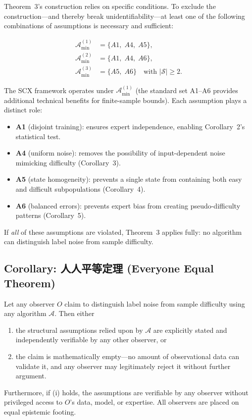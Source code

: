 Theorem~3's construction relies on specific conditions.  To exclude the
construction---and thereby break unidentifiability---at least one of the
following combinations of assumptions is necessary and sufficient:

\[
\begin{aligned}
\mathcal{A}_{\min}^{(1)} &= \{A1,\;A4,\;A5\},\\
\mathcal{A}_{\min}^{(2)} &= \{A1,\;A4,\;A6\},\\
\mathcal{A}_{\min}^{(3)} &= \{A5,\;A6\}\quad\text{with }|\mathcal{S}|\ge2.
\end{aligned}
\]

The SCX framework operates under $\mathcal{A}_{\min}^{(1)}$ (the standard
set A1--A6 provides additional technical benefits for finite-sample bounds).
Each assumption plays a distinct role:
\begin{itemize}
  \item \textbf{A1} (disjoint training): ensures expert independence, enabling
    Corollary~2's statistical test.
  \item \textbf{A4} (uniform noise): removes the possibility of
    input-dependent noise mimicking difficulty (Corollary~3).
  \item \textbf{A5} (state homogeneity): prevents a single state from
    containing both easy and difficult subpopulations (Corollary~4).
  \item \textbf{A6} (balanced errors): prevents expert bias from creating
    pseudo-difficulty patterns (Corollary~5).
\end{itemize}

If \emph{all} of these assumptions are violated, Theorem~3 applies fully:
no algorithm can distinguish label noise from sample difficulty.

\subsection{Corollary: 人人平等定理 (Everyone Equal Theorem)}
\label{sec:thm3_equal}

\begin{corollary}
\label{cor:everyone-equal}
Let any observer $O$ claim to distinguish label noise from sample difficulty
using any algorithm $\mathcal{A}$. Then either
\begin{enumerate}[label=(\roman*)]
  \item the structural assumptions relied upon by $\mathcal{A}$ are
    explicitly stated and independently verifiable by any other observer,
    or
  \item the claim is mathematically empty---no amount of observational
    data can validate it, and any observer may legitimately reject it
    without further argument.
\end{enumerate}
Furthermore, if (i) holds, the assumptions are verifiable by any observer
without privileged access to $O$'s data, model, or expertise. All observers
are placed on equal epistemic footing.
\end{corollary}

